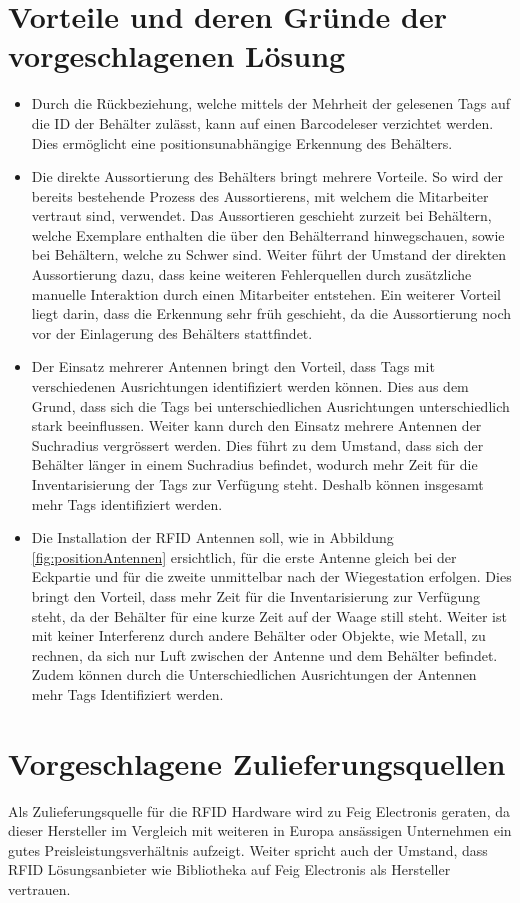 \section{Vorteile und deren Gründe der vorgeschlagenen Lösung}
\begin{itemize}
	\item Durch die Rückbeziehung, welche mittels der Mehrheit der gelesenen Tags auf die ID der Behälter zulässt, kann auf einen Barcodeleser verzichtet werden. Dies ermöglicht eine positionsunabhängige Erkennung des Behälters.
	\item Die direkte Aussortierung des Behälters bringt mehrere Vorteile. So wird der bereits bestehende Prozess des Aussortierens, mit welchem die Mitarbeiter vertraut sind, verwendet. Das Aussortieren geschieht zurzeit bei Behältern, welche Exemplare enthalten die über den Behälterrand hinwegschauen, sowie bei Behältern, welche zu Schwer sind. Weiter führt der Umstand der direkten Aussortierung dazu, dass keine weiteren Fehlerquellen durch zusätzliche manuelle Interaktion durch einen Mitarbeiter entstehen. Ein weiterer Vorteil liegt darin, dass die Erkennung sehr früh geschieht, da die Aussortierung noch vor der Einlagerung des Behälters stattfindet.
	\item Der Einsatz mehrerer Antennen bringt den Vorteil, dass Tags mit verschiedenen Ausrichtungen identifiziert werden können. Dies aus dem Grund, dass sich die Tags bei unterschiedlichen Ausrichtungen unterschiedlich stark beeinflussen. Weiter kann durch den Einsatz mehrere Antennen der Suchradius vergrössert werden. Dies führt zu dem Umstand, dass sich der Behälter länger in einem Suchradius befindet, wodurch mehr Zeit für die Inventarisierung der Tags zur Verfügung steht. Deshalb können insgesamt mehr Tags identifiziert  werden.
	\item Die Installation der RFID Antennen soll, wie in Abbildung \ref{fig:positionAntennen} ersichtlich, für die erste Antenne gleich bei der Eckpartie und für die zweite unmittelbar nach der Wiegestation erfolgen. Dies bringt den Vorteil, dass mehr Zeit für die Inventarisierung zur Verfügung steht, da der Behälter für eine kurze Zeit auf der Waage still steht. Weiter ist mit keiner Interferenz durch andere Behälter oder Objekte, wie Metall, zu rechnen, da sich nur Luft zwischen der Antenne und dem Behälter befindet. Zudem können durch die Unterschiedlichen Ausrichtungen der Antennen mehr Tags Identifiziert werden.
\end{itemize}


\section{Vorgeschlagene Zulieferungsquellen}
Als Zulieferungsquelle für die RFID Hardware wird zu Feig Electronis geraten, da dieser Hersteller im Vergleich mit weiteren in Europa ansässigen Unternehmen ein gutes Preisleistungsverhältnis aufzeigt. Weiter spricht auch der Umstand, dass RFID Lösungsanbieter wie Bibliotheka auf Feig Electronis als Hersteller vertrauen.


